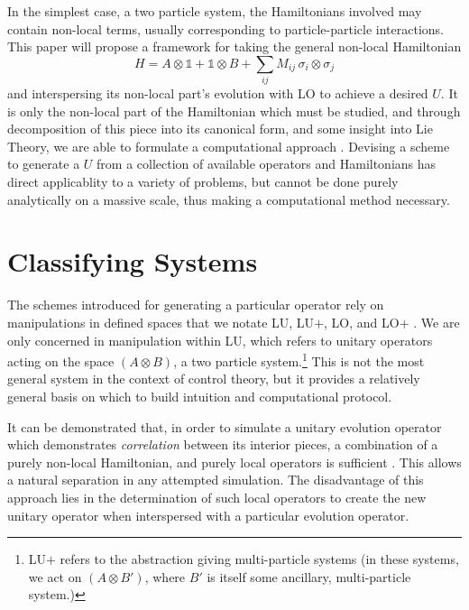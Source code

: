 \documentclass[11pt,twocolumn]{article}
\begin{document}
	In the simplest case, a two particle system, the Hamiltonians involved may contain non-local terms, usually corresponding to particle-particle interactions. This paper will propose a framework for taking the general non-local Hamiltonian \cite{bennett} 
	\begin{equation}
	H = A \otimes \mathds{1} + \mathds{1} \otimes B + \sum_{ij} M_{ij}\,  \sigma_i \otimes \sigma_j
	\end{equation}
	and interspersing its non-local part's evolution with LO to achieve a desired $U$. It is only the non-local part of the Hamiltonian which must be studied, and through decomposition of this piece into its canonical form, and some insight into Lie Theory, we are able to formulate a computational approach \cite{haselgrove}. Devising a scheme to generate a $U$ from a collection of available operators and Hamiltonians has direct applicablity to a variety of problems, but cannot be done purely analytically on a massive scale, thus making a computational method necessary.




	\section{Classifying Systems}

	The schemes introduced for generating a particular operator rely on manipulations in defined spaces that we notate LU, LU$+$, LO, and LO$+$ \cite{bennett}. We are only concerned in manipulation within LU, which refers to unitary operators acting on the space $\left(A\otimes B\right)$, a two particle system.\footnote{LU$+$ refers to the abstraction giving multi-particle systems (in these systems, we act on $\left(A\otimes B'\right)$, where $B'$ is itself some ancillary, multi-particle system.)} This is not the most general system in the context of control theory, but it provides a relatively general basis on which to build intuition and computational protocol.

	It can be demonstrated that, in order to simulate a unitary evolution operator which demonstrates \emph{correlation} between its interior pieces, a combination of a purely non-local Hamiltonian, and purely local operators is sufficient \cite{bennett}. This allows a natural separation in any attempted simulation. The disadvantage of this approach lies in the determination of such local operators to create the new unitary operator when interspersed with a particular evolution operator.  
\end{document}
